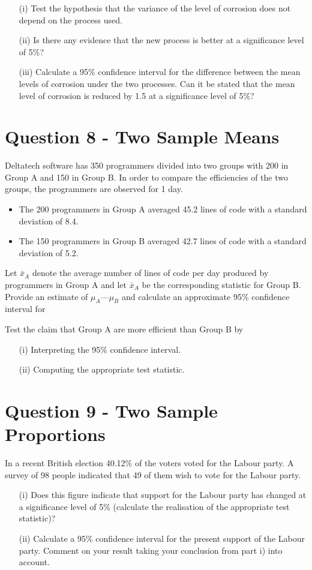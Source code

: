 \documentclass[12pt, a4paper]{report}
\theoremstyle{plain}
\theoremstyle{definition}
\theoremstyle{remark}
\begin{document}
\begin{itemize}
\item[(i)] Test the hypothesis that the variance of the level of corrosion does not depend on the process used.
\item[(ii)] Is there any evidence that the new process is better at a significance level of 5\%?
\item[(iii)] Calculate a 95\% confidence interval for the difference between the mean levels of corrosion under the two processes. Can it be stated that the mean level of corrosion is reduced by 1.5 at a significance level of 5\%? 
\end{itemize}

\section*{Question 8 - Two Sample Means}
Deltatech software has 350 programmers divided into two groups with 200 in Group A
and 150 in Group B. In order to compare the efficiencies of the two groups, the
programmers are observed for 1 day.
\begin{itemize}
\item The 200 programmers in Group A averaged 45.2 lines of code with a standard
deviation of 8.4.
\item The 150 programmers in Group B averaged 42.7 lines of code with a standard
deviation of 5.2.
\end{itemize}
Let $\bar{x}_A$ denote the average number of lines of code per day produced by programmers in
Group A and
let $\bar{x}_A$ be the corresponding statistic for Group B.
Provide an estimate of $\mu_A —\mu_B$ and calculate an approximate 95\% confidence interval for

Test the claim that Group A are more efficient than Group B by
\begin{itemize}
\item[(i)] Interpreting the 95\% confidence interval.
\item[(ii)] Computing the appropriate test statistic.
\end{itemize}
\section*{Question 9 - Two Sample Proportions}
In a recent British election 40.12\% of the voters voted for the Labour party. A survey of 98 people indicated that 49 of them wish to vote for the Labour party. 
\begin{itemize}
\item[(i)] Does this figure indicate that support for the Labour party has changed at a significance level of 5\% (calculate the realisation of the appropriate test statistic)? 
\item[(ii)] Calculate a 95\% confidence interval for the present support of the Labour party. Comment on your result taking your conclusion from part i) into account. 
\end{itemize}
\end{document}
